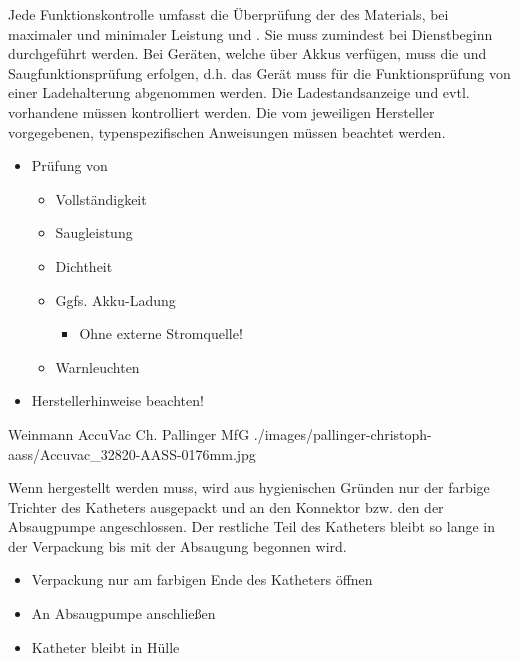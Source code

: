 {%
Jede Funktionskontrolle umfasst die Überprüfung der
 des Materials,  bei
maximaler und minimaler Leistung und . Sie muss
zumindest bei Dienstbeginn durchgeführt werden.
Bei Geräten, welche über Akkus verfügen, muss die
 und Saugfunktionsprüfung  erfolgen, d.h. das Gerät muss
für die Funktionsprüfung von einer Ladehalterung abgenommen
werden. Die Ladestandsanzeige und evtl. vorhandene
 müssen kontrolliert werden.
Die vom jeweiligen Hersteller vorgegebenen,
typenspezifischen Anweisungen müssen beachtet werden. 
}{
\begin{itemize}
   \item Prüfung von
   \begin{itemize}
      \item Vollständigkeit
      \item Saugleistung
      \item Dichtheit
      \item Ggfs. Akku-Ladung
      \begin{itemize}
         \item Ohne externe Stromquelle!
      \end{itemize}
      \item Warnleuchten
   \end{itemize}
   \item Herstellerhinweise beachten!
\end{itemize}
}{}{}{}



\PictureWide
{Weinmann AccuVac{\protect\texttrademark}}%
{}%
{}%
{Ch. Pallinger}%
{MfG}%
{./images/pallinger-christoph-aass/Accuvac_32820-AASS-0176mm.jpg}%
{}%
{}%




{%
Wenn  hergestellt werden muss, wird
aus hygienischen Gründen nur der farbige Trichter des
Katheters ausgepackt und an den Konnektor bzw. den
 der Absaugpumpe angeschlossen. Der restliche
Teil des Katheters bleibt so lange in der Verpackung bis mit
der Absaugung begonnen
wird.
}{
\begin{itemize}
  \item Verpackung nur am farbigen Ende des Katheters öffnen
  \item An Absaugpumpe anschließen
  \item Katheter bleibt in Hülle
\end{itemize}
}
{}
{}
{}

